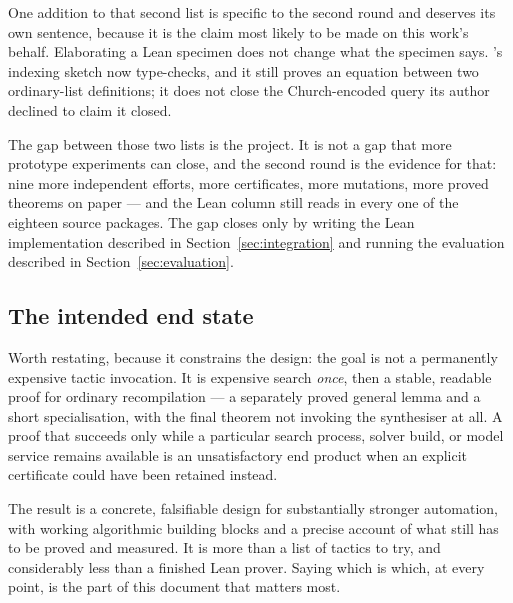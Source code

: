 One addition to that second list is specific to the second round and deserves
its own sentence, because it is the claim most likely to be made on this work's
behalf. Elaborating a Lean specimen does not change what the specimen says.
's indexing sketch now type-checks, and it still proves an equation
between two ordinary-list definitions; it does not close the Church-encoded
query its author declined to claim it closed.

The gap between those two lists is the project. It is not a gap that more
prototype experiments can close, and the second round is the evidence for that:
nine more independent efforts, more certificates, more mutations, more proved
theorems on paper --- and the Lean column still reads  in every
one of the eighteen source packages. The gap closes only by writing the Lean
implementation described in Section~\ref{sec:integration} and running the
evaluation described in Section~\ref{sec:evaluation}.

\subsection{The intended end state}

Worth restating, because it constrains the design: the goal is not a permanently
expensive tactic invocation. It is expensive search \emph{once}, then a stable,
readable proof for ordinary recompilation --- a separately proved general lemma
and a short specialisation, with the final theorem not invoking the synthesiser
at all. A proof that succeeds only while a particular search process, solver
build, or model service remains available is an unsatisfactory end product when
an explicit certificate could have been retained instead.

The result is a concrete, falsifiable design for substantially stronger
automation, with working algorithmic building blocks and a precise account of
what still has to be proved and measured. It is more than a list of tactics to
try, and considerably less than a finished Lean prover. Saying which is which,
at every point, is the part of this document that matters most.
